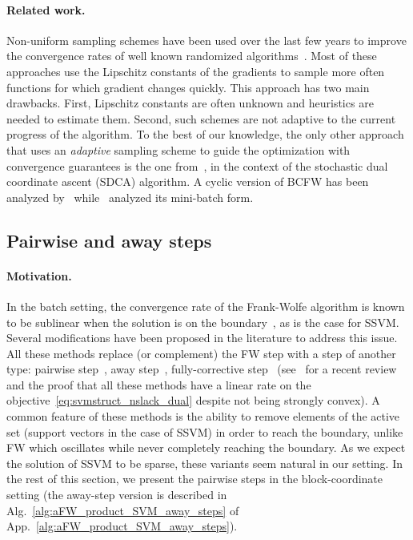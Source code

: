 \documentclass{article}
\begin{document}
\paragraph{Related work.}
Non-uniform sampling schemes have been used over the last few years to improve the convergence rates of well known randomized algorithms~\cite{Nesterov:2012fa,needell2014,ZhaoImportanceSampling_ICML15}.
%
Most of these approaches use the Lipschitz constants of the gradients to sample more often functions for which gradient changes quickly.
This approach has two main drawbacks.
First, Lipschitz constants are often unknown and heuristics are needed to estimate them.
Second, such schemes are not adaptive to the current progress of the algorithm.
%
To the best of our knowledge, the only other approach that uses an \emph{adaptive} sampling scheme to guide the optimization with convergence guarantees is the one from~\citet{Csiba15adaSDCA}, in the context of the stochastic dual coordinate ascent (SDCA) algorithm.
A cyclic version of BCFW has been analyzed by~\citet{beck2015cyclicBCFW} while~\citet{wang2014parallelBCFW} analyzed its mini-batch form.

%
%
%
%
%
%
%
%
%
%
%
%
%
%
%
%
%


\subsection{Pairwise and away steps \label{sec:pairwise_away_steps}}
%
\paragraph{Motivation.}
In the batch setting, the convergence rate of the Frank-Wolfe algorithm is known to be sublinear
%
when the solution is on the boundary~\citep{Wolfe:1970wy}, as is the case for SSVM\@.
Several modifications have been proposed in the literature to address this issue.
All these methods replace (or complement) the FW step with a step of another type: pairwise step~\citep{Mitchell:1974uy}, away step~\citep{Wolfe:1970wy}, fully-corrective step~\citep{Holloway:1974:FCFW} (see~\citet{LacosteJulien2015linearFW} for a recent review and the proof that all these methods have a linear rate on the objective~\eqref{eq:svmstruct_nslack_dual} despite not being strongly convex).
A common feature of these methods is the ability to remove elements of the active set (support vectors in the case of SSVM) in order to reach the boundary, unlike FW which oscillates while never completely reaching the boundary. As we expect the solution of SSVM to be sparse, these variants seem natural in our setting.
In the rest of this section, we present the pairwise steps in the block-coordinate setting (the away-step version is described in Alg.~\ref{alg:aFW_product_SVM_away_steps} of App.~\ref{alg:aFW_product_SVM_away_steps}).
%
\end{document}

